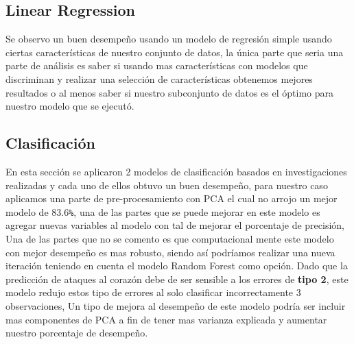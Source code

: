 \documentclass[10pt,journal]{IEEEtran}
\begin{document}
\subsection{Linear Regression}


Se observo un buen desempeño usando un modelo de regresión simple usando ciertas características de nuestro conjunto de datos, la única parte que seria una parte de análisis es saber si usando mas características con modelos que discriminan y realizar una selección de características obtenemos mejores resultados o al menos saber si nuestro subconjunto de datos es el óptimo para nuestro modelo que se ejecutó.

\subsection{Clasificación}

En esta sección se aplicaron 2 modelos de clasificación basados en investigaciones realizadas y cada uno de ellos obtuvo un buen desempeño, para nuestro caso aplicamos una parte de pre-procesamiento con PCA el cual no arrojo un mejor modelo de 83.6\verb|%|, una de las partes que se puede mejorar en este modelo es agregar nuevas variables al modelo con tal de mejorar el porcentaje de precisión, Una de las partes que no se comento es que computacional mente este modelo con mejor desempeño es mas robusto, siendo así podríamos realizar una nueva iteración teniendo en cuenta el modelo Random Forest como opción. Dado que la predicción de ataques al corazón debe de ser sensible a los errores de \textbf{tipo 2}, este modelo redujo estos tipo de errores al solo clasificar incorrectamente 3 observaciones, Un tipo de mejora al desempeño de este modelo podría ser incluir mas componentes de PCA a fin de tener mas varianza explicada y aumentar nuestro porcentaje de desempeño.
\end{document}
